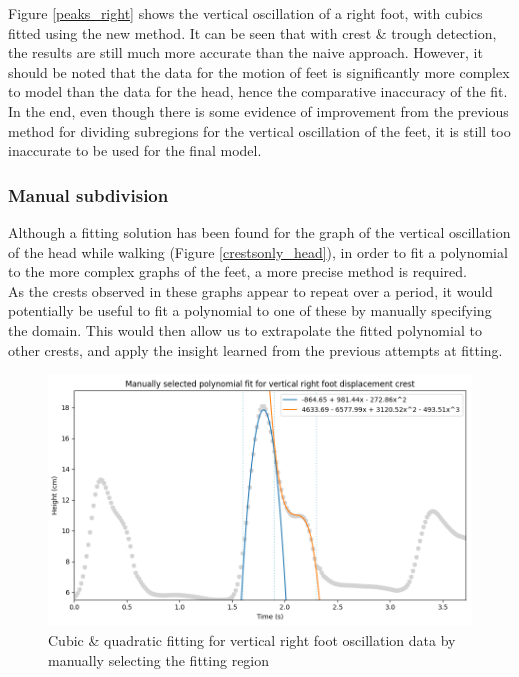 \documentclass[12pt, a4paper]{article}
\begin{document}
Figure \ref{peaks_right} shows the vertical oscillation of a right foot, with
cubics fitted using the new method. It can be seen that with crest \& trough
detection, the results are still much more accurate than the naive approach.
However, it should be noted that the data for the motion of feet is
significantly more complex to model than the data for the head, hence the
comparative inaccuracy of the fit. In the end, even though there is some
evidence of improvement from the previous method for dividing subregions for the
vertical oscillation of the feet, it is still too inaccurate to be used for the
final model.

\subsubsection{Manual subdivision}
Although a fitting solution has been found for the graph of the vertical
oscillation of the head while walking (Figure \ref{crestsonly_head}), in order
to fit a polynomial to the more complex graphs of the feet, a more precise
method is required. \\

As the crests observed in these graphs appear to repeat over a period, it would
potentially be useful to fit a polynomial to one of these by manually specifying
the domain. This would then allow us to extrapolate the fitted polynomial to
other crests, and apply the insight learned from the previous attempts at
fitting. \\

\begin{figure}[H]
    \centering
    \includegraphics[width=14cm]{p_manual_right.png}
    \caption{ Cubic \& quadratic fitting for vertical right foot oscillation
        data by manually selecting the fitting region }
    \label{manual_right}
\end{figure}
\end{document}
